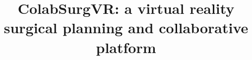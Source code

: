 \documentclass{bmcart}
\begin{document}
\begin{frontmatter}

\begin{fmbox}


\title{ColabSurgVR: a virtual reality surgical planning and collaborative platform}



\end{fmbox}
\end{frontmatter}
\end{document}
